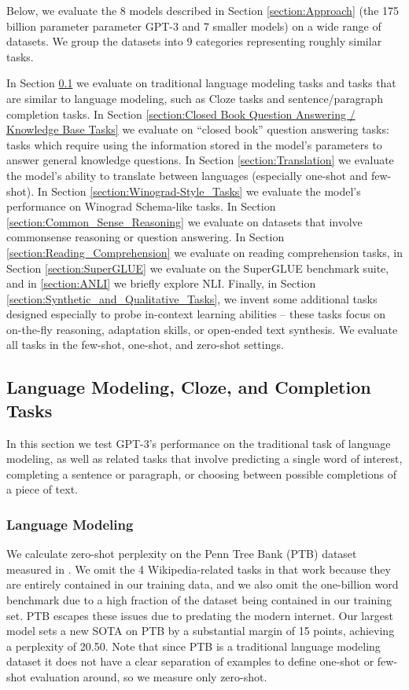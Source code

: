 \documentclass{article}
\begin{document}
Below, we evaluate the 8 models described in Section \ref{section:Approach} (the 175 billion parameter parameter GPT-3 and 7 smaller models) on a wide range of datasets. We group the datasets into 9 categories representing roughly similar tasks.  

In Section \ref{section:Language Modeling, Cloze, and Completion Tasks} we evaluate on traditional language modeling tasks and tasks that are similar to language modeling, such as Cloze tasks and sentence/paragraph completion tasks.  In Section \ref{section:Closed Book Question Answering / Knowledge Base Tasks} we evaluate on ``closed book'' question answering tasks: tasks which require using the information stored in the model’s parameters to answer general knowledge questions.  In Section \ref{section:Translation} we evaluate the model’s ability to translate between languages (especially one-shot and few-shot).  In Section \ref{section:Winograd-Style_Tasks} we evaluate the model’s performance on Winograd Schema-like tasks.  In Section \ref{section:Common_Sense_Reasoning} we evaluate on datasets that involve commonsense reasoning or question answering.  In Section \ref{section:Reading_Comprehension} we evaluate on reading comprehension tasks, in Section \ref{section:SuperGLUE} we evaluate on the SuperGLUE benchmark suite, and in \ref{section:ANLI} we briefly explore NLI.  Finally, in Section \ref{section:Synthetic_and_Qualitative_Tasks}, we invent some additional tasks designed especially to probe in-context learning abilities -- these tasks focus on on-the-fly reasoning, adaptation skills, or open-ended text synthesis. We evaluate all tasks in the few-shot, one-shot, and zero-shot settings.
 
    \subsection{Language Modeling, Cloze, and Completion Tasks}
    \label{section:Language Modeling, Cloze, and Completion Tasks}
    In this section we test GPT-3’s performance on the traditional task of language modeling, as well as related tasks that involve predicting a single word of interest, completing a sentence or paragraph, or choosing between possible completions of a piece of text. 
        \subsubsection{Language Modeling}
        \label{section:Language Modeling}
        We calculate zero-shot perplexity on the Penn Tree Bank (PTB) \cite{marcus1994penn} dataset measured in \cite{radford2019language}. We omit the 4 Wikipedia-related tasks in that work because they are entirely contained in our training data, and we also omit the one-billion word benchmark due to a high fraction of the dataset being contained in our training set.  PTB escapes these issues due to predating the modern internet. Our largest model sets a new SOTA on PTB by a substantial margin of 15 points, achieving a perplexity of 20.50. Note that since PTB is a traditional language modeling dataset it does not have a clear separation of examples to define one-shot or few-shot evaluation around, so we measure only zero-shot.
\end{document}
